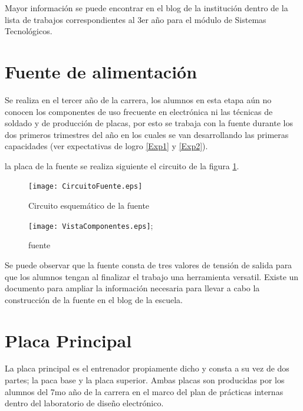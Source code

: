 Mayor información se puede encontrar en el blog de la institución dentro de la lista de trabajos correspondientes al 3er año para el módulo de Sistemas Tecnológicos. 


\section{Fuente de alimentación}
Se realiza en el tercer año de la carrera, los alumnos en esta etapa aún no conocen los componentes de uso frecuente en electrónica ni las técnicas de soldado y de producción de placas, por esto se trabaja con la fuente durante los dos primeros trimestres del año en los cuales se van desarrollando las primeras capacidades (ver expectativas de logro \ref{Exp1} y \ref{Exp2}).

la placa de la fuente se realiza siguiente el circuito de la figura \ref{CircuitoFuente}.

\begin{figure}[]
	\texttt{[image: CircuitoFuente.eps]}\caption{Circuito esquemático de la fuente}\label{CircuitoFuente}
\end{figure}
\begin{figure}[]
	\texttt{[image: VistaComponentes.eps]};
	 \caption{fuente}\label{LadoComponentesFuente}
\end{figure}

Se puede observar que la fuente consta de tres valores de tensión de salida para que los alumnos tengan al finalizar el trabajo una herramienta versatil. Existe un documento para ampliar la información necesaria para llevar a cabo la construcción de la fuente en el blog de la escuela.

\section{Placa Principal}
La placa principal es el entrenador propiamente dicho y consta a su vez de dos partes; la paca base y la placa superior. Ambas placas son producidas por los alumnos del 7mo año de la carrera en el marco del plan de prácticas internas dentro del laboratorio de diseño electrónico.
